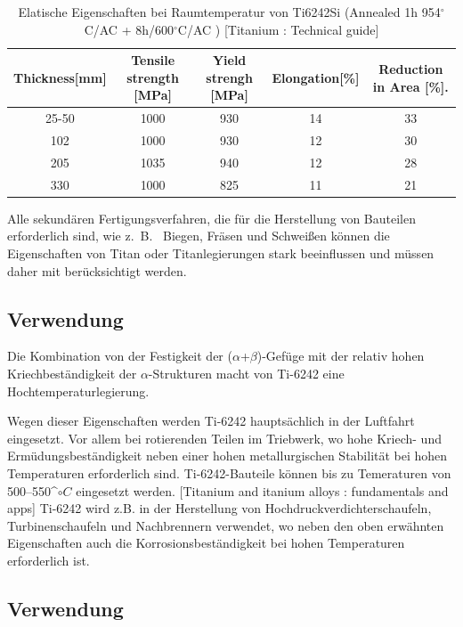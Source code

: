 \begin{table}[H]
	\small
	\tabcolsep=0.09cm
	\centering	
	\begin{tabular}{|c |c |c|c |c|}
		\hline
		\centering
		Thickness[mm] & Tensile strength [MPa] & Yield strengh [MPa] & Elongation[\%]& Reduction in Area [\%]. \\
		\hline
		25-50&1000&930&14&33\\
		102&1000&930&12&30\\
		205&1035&940&12&28\\
		330&1000&825&11&21\\
		
		\hline
	\end{tabular}
	\caption{Elatische Eigenschaften bei Raumtemperatur von Ti6242Si (Annealed 1h 954$^\circ$C/AC + 8h/600$^\circ$C/AC )  [Titanium : Technical guide]}
	\label{Mecprop}
\end{table}


Alle sekundären Fertigungsverfahren, die für die Herstellung von Bauteilen erforderlich sind, wie z.~B.~ Biegen, Fräsen und Schweißen können die  Eigenschaften von Titan oder Titanlegierungen stark beeinflussen und müssen daher mit berücksichtigt werden.




\subsection{Verwendung}


Die Kombination von der Festigkeit der ($\alpha$+$\beta$)-Gefüge mit der relativ hohen Kriechbeständigkeit der $\alpha$-Strukturen macht von Ti-6242 eine Hochtemperaturlegierung. 

Wegen dieser Eigenschaften werden Ti-6242 hauptsächlich in der Luftfahrt eingesetzt. Vor allem bei rotierenden Teilen im Triebwerk, wo hohe Kriech- und Ermüdungsbeständigkeit neben einer hohen metallurgischen Stabilität bei hohen Temperaturen erforderlich sind. 
Ti-6242-Bauteile können bis zu Temeraturen von  500--550^$\circ C$ eingesetzt werden. [Titanium and itanium alloys : fundamentals and apps]
Ti-6242 wird z.B. in der Herstellung von Hochdruckverdichterschaufeln, Turbinenschaufeln und Nachbrennern verwendet, wo neben den oben erwähnten Eigenschaften auch die Korrosionsbeständigkeit bei hohen Temperaturen erforderlich ist. 


\subsection{Verwendung}


